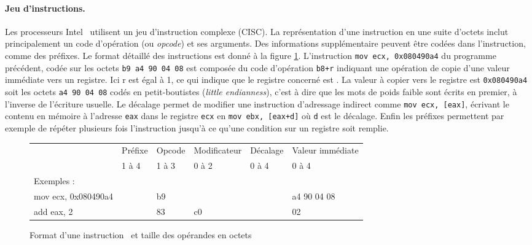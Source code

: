 \paragraph{Jeu d'instructions.}
Les processeurs Intel \xq\ utilisent un jeu d'instruction complexe (CISC). La représentation d'une instruction en une suite d'octets inclut principalement un code d'opération (ou \emph{opcode}) et ses arguments. Des informations supplémentaire peuvent être codées dans l'instruction, comme des préfixes. Le format détaillé des instructions est donné à la figure \ref{fig:format_insts_x86}.
L'instruction \texttt{mov ecx, 0x080490a4} du programme précédent, codée sur les octets \texttt{b9 a4 90 04 08} est composée du code d'opération \texttt{b8+r} indiquant une opération de copie d'une valeur immédiate vers un registre. Ici r est égal à 1, ce qui indique que le registre concerné est \ecx. La valeur à copier vers le registre est \texttt{0x080490a4} soit les octets \texttt{a4 90 04 08} codés en petit-boutistes (\emph{little endianness}), c'est à dire que les mots de poids faible sont écrits en premier, à l'inverse de l'écriture usuelle.
Le décalage permet de modifier une instruction d'adressage indirect comme \texttt{mov ecx, [eax]}, écrivant le contenu en mémoire à l'adresse \texttt{eax} dans le registre \texttt{ecx} en \texttt{mov ebx, [eax+d]} où \texttt{d} est le décalage.
Enfin les préfixes permettent par exemple de répéter plusieurs fois l'instruction jusqu'à ce qu'une condition sur un registre soit remplie.

\begin{figure}[h]
\begin{center} 
\begin{tabular}{l|l|l|l|l|l|}
\cline{2-6}
& Préfixe & Opcode & Modificateur & Décalage & Valeur immédiate \\
& 1 à 4 & 1 à 3 & 0 à 2 & 0 à 4 & 0 à 4\\
\cline{2-6}
\multicolumn{1}{l}{Exemples :} & \multicolumn{5}{l}{}\\
\hline
\multicolumn{1}{|l|}{mov ecx, 0x080490a4} & & b9 & & & a4 90 04 08 \\
\multicolumn{1}{|l|}{add eax, 2} & & 83 & c0 & & 02 \\
\hline
\end{tabular}
\end{center} 
\caption{Format d'une instruction \xq\ et taille des opérandes en octets}
\label{fig:format_insts_x86}
\end{figure}

